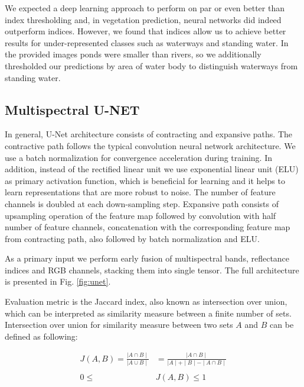 \documentclass[10pt,twocolumn,letterpaper]{article}
\begin{document}
We expected a deep learning approach to perform on par or even better than index thresholding and, in vegetation prediction, neural networks did indeed outperform indices. However, we found that indices allow us to achieve better results for under-represented classes such as waterways and standing water. In the provided images ponds were smaller than rivers, so we additionally thresholded our predictions by area of water body to distinguish waterways from standing water.

\subsection{Multispectral U-NET}

In general, U-Net architecture consists of contracting and expansive paths. The contractive path follows the typical convolution neural network architecture.
We use a batch normalization \cite{batchnorm} for convergence acceleration during training. In addition, instead of the rectified linear unit we use exponential linear unit (ELU) \cite{elu} as primary activation function, which is beneficial for learning and it helps to learn representations that are more robust to noise. The number of feature channels is doubled at each down-sampling step. Expansive path consists of upsampling operation of the feature map followed by convolution with half number of feature channels, concatenation with the corresponding feature map from contracting path, also followed by batch normalization and ELU.

As a primary input we perform early fusion of multispectral bands, reflectance indices and RGB channels, stacking them into single tensor. The full architecture is presented in Fig. \ref{fig:unet}.


Evaluation metric is the Jaccard index, also known as intersection over union, which can be interpreted as similarity  measure between a finite number of sets. Intersection over union for similarity measure between two sets $A$ and $B$ can be defined as following:

\begin{equation}
\begin{aligned}
J(A, B) = \frac{\mid A \cap B \mid }{\mid A \cup B \mid} &= \frac{\mid A \cap B \mid}{\mid A \mid + \mid B \mid - \mid A \cap B \mid} \\ \\
0 \le & J(A, B) \le 1
\end{aligned}
\end{equation}
\end{document}
